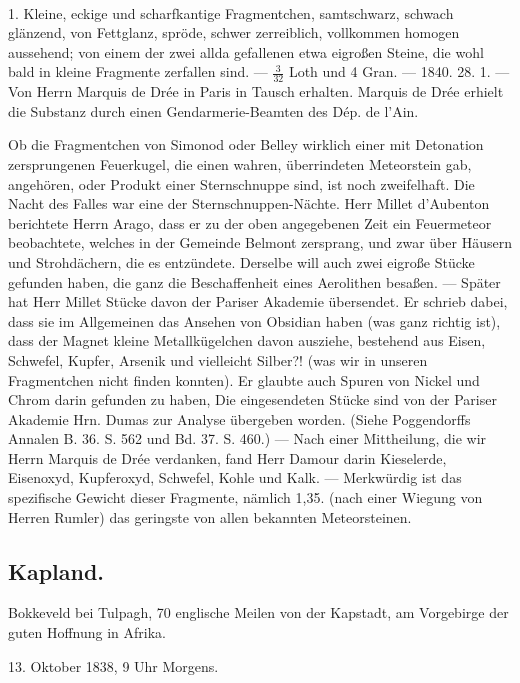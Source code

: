 \documentclass[a4paper, 11pt, oneside, polutonikogreek, german]{article}
\begin{document}
\paragraph{}
1. Kleine, eckige und scharfkantige Fragmentchen, samtschwarz, schwach glänzend, von Fettglanz, spröde, schwer zerreiblich, vollkommen homogen aussehend; von einem der zwei allda gefallenen etwa eigroßen Steine, die wohl bald in kleine Fragmente zerfallen sind. — $\frac{3}{32}$ Loth und 4 Gran. — 1840. 28. 1. — Von Herrn Marquis de Drée in Paris in Tausch erhalten. Marquis de Drée erhielt die Substanz durch einen Gendarmerie-Beamten des Dép. de l'Ain.

Ob die Fragmentchen von Simonod oder Belley wirklich einer mit Detonation zersprungenen Feuerkugel, die einen wahren, überrindeten Meteorstein gab, angehören, oder Produkt einer Sternschnuppe sind, ist noch zweifelhaft. Die Nacht des Falles war eine der Sternschnuppen-Nächte. Herr Millet d’Aubenton berichtete Herrn Arago, dass er zu der oben angegebenen Zeit ein Feuermeteor beobachtete, welches in der Gemeinde Belmont zersprang, und zwar über Häusern und Strohdächern, die es entzündete. Derselbe will auch zwei eigroße Stücke gefunden haben, die ganz die Beschaffenheit eines Aerolithen besaßen. — Später hat Herr Millet Stücke davon der Pariser Akademie übersendet. Er schrieb dabei, dass sie im Allgemeinen das Ansehen von Obsidian haben (was ganz richtig ist), dass der Magnet kleine Metallkügelchen davon ausziehe, bestehend aus Eisen, Schwefel, Kupfer, Arsenik und vielleicht Silber?! (was wir in unseren Fragmentchen nicht finden konnten). Er glaubte auch Spuren von Nickel und Chrom darin gefunden zu haben, Die eingesendeten Stücke sind von der Pariser Akademie Hrn. Dumas zur Analyse übergeben worden. (Siehe Poggendorffs Annalen B. 36. S. 562 und Bd. 37. S. 460.) — Nach einer Mittheilung, die wir Herrn Marquis de Drée verdanken, fand Herr Damour darin Kieselerde, Eisenoxyd, Kupferoxyd, Schwefel, Kohle und Kalk. — Merkwürdig ist das spezifische Gewicht dieser Fragmente‚ nämlich 1,35. (nach einer Wiegung von Herren Rumler) das geringste von allen bekannten Meteorsteinen.
\subsection{Kapland.}
\begin{center}
\small
Bokkeveld bei Tulpagh, 70 englische Meilen von der Kapstadt, am Vorgebirge der guten Hoffnung in Afrika.

13. Oktober 1838, 9 Uhr Morgens.
\end{center}
\end{document}
